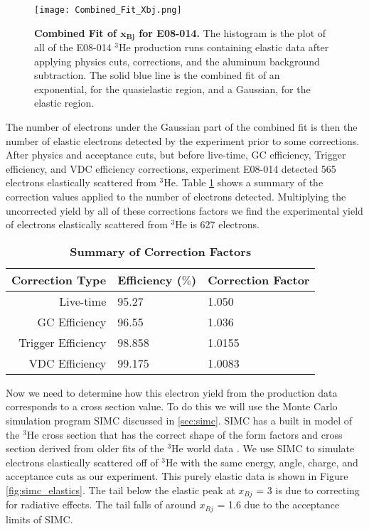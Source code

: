 \begin{figure}[!ht]
\begin{center}
\texttt{[image: Combined\_Fit\_Xbj.png]}
\end{center}
\caption[Combined Fit of $x_{Bj}$ for E08-014]{
{\bf{Combined Fit of $\boldsymbol{x_{Bj}}$ for E08-014.}} The histogram is the plot of all of the E08-014 $^3$He production runs containing elastic data after applying physics cuts, corrections, and the aluminum background subtraction. The solid blue line is the combined fit of an exponential, for the quasielastic region, and a Gaussian, for the elastic region.}
\label{fig:combined}
\end{figure}

The number of electrons under the Gaussian part of the combined fit is then the number of elastic electrons detected by the experiment prior to some corrections. After physics and acceptance cuts, but before live-time, GC efficiency, Trigger efficiency, and VDC efficiency corrections, experiment E08-014 detected 565 electrons elastically scattered from $^3$He. Table \ref{tab:corrections} shows a summary of the correction values applied to the number of electrons detected. Multiplying the uncorrected yield by all of these corrections factors we find the experimental yield of electrons elastically scattered from  $^3$He is 627 electrons.

\vspace{5mm}

\begin{table}[!h]
\centering
\begin{tabular}{|r | l l|}
\hline
\textbf{Correction Type} & \textbf{Efficiency ($\%$)} & \textbf{Correction Factor}\\
\hline
Live-time & 95.27 & 1.050 \\ 
GC Efficiency & 96.55 & 1.036 \\ 
Trigger Efficiency & 98.858 & 1.0155 \\ 
VDC Efficiency & 99.175 &  1.0083\\ 
\hline
\end{tabular}
\caption[Summary of Correction Factors]{{\bf{Summary of Correction Factors}} }
\label{tab:corrections}
\end{table}

Now we need to determine how this electron yield from the production data corresponds to a cross section value. To do this we will use the Monte Carlo simulation program SIMC discussed in \ref{sec:simc}. SIMC has a built in model of the $^3$He cross section that has the correct shape of the form factors and cross section derived from older fits of the $^3$He world data \cite{Article:Amroun}. We use SIMC to simulate electrons elastically scattered off of $^3$He with the same energy, angle, charge, and acceptance cuts as our experiment. This purely elastic data is shown in Figure \ref{fig:simc_elastics}. The tail below the elastic peak at $x_{Bj}$ = 3 is due to correcting for radiative effects. The tail falls of around $x_{Bj}$ = 1.6 due to the acceptance limits of SIMC.

